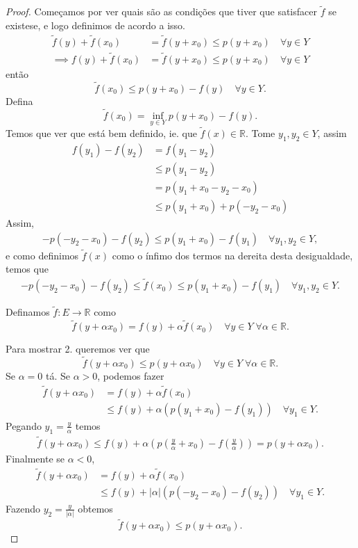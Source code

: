 \documentclass[portuguese]{article}
\theoremstyle{definition}
\newcommand{\R}{\mathbb{R}}
\begin{document}
	\begin{proof}
		Começamos por ver quais são as condições que tiver que satisfacer $\tilde{f}$ se existese, e logo definimos de acordo a isso.
		\begin{align*}
			\tilde{f}(y)+\tilde{f}(x_0)&=\tilde{f}(y+ x_0)\leq p(y+x_0)\quad\forall y\in Y\\
			\implies f(y)+\tilde{f}(x_0)&=\tilde{f}(y+ x_0)\leq p(y+x_0)\quad\forall y\in Y
		\end{align*}
		então
		\[\tilde{f}(x_0)\leq p(y+x_0)-f(y)\quad\forall y\in Y.\]
		Defina
		\[\tilde{f}(x_0)=\inf_{y\in Y}p(y+x_0)-f(y).\]
		Temos que ver que está bem definido, ie. que $\tilde{f}(x)\in\R$. Tome $y_1,y_2\in Y$, assim
		\begin{align*}
			f(y_1)-f(y_2)&=f(y_1-y_2)\\
			&\leq p(y_1-y_2)\\
			&=p(y_1+x_0-y_2-x_0)\\
			&\leq p(y_1+x_0)+p(-y_2-x_0)
		\end{align*}
		Assim,
		\begin{gather*}
			-p(-y_2-x_0)-f(y_2)\leq p(y_1+x_0)-f(y_1)\quad\forall y_1,y_2\in Y,
		\end{gather*}
		e como definimos $\tilde{f}(x)$ como o ínfimo dos termos na dereita desta desigualdade, temos que
		\begin{align*}
			-p(-y_2-x_0)-f(y_2)\leq\tilde{f}(x_0)\leq p(y_1+x_0)-f(y_1)\quad\forall y_1,y_2\in Y.
		\end{align*}
		
		Definamos $\tilde{f}:E\to\R$ como \[\tilde{f}(y+\alpha x_0)=f(y)+\alpha\tilde{f}(x_0)\quad\forall y\in Y\; \forall\alpha\in\R.\]
		
		Para mostrar 2. queremos ver que
		\[\tilde{f}(y+\alpha x_0)\leq p(y+\alpha x_0)\quad\forall y\in Y\;\forall\alpha\in\R.\]
		Se $\alpha=0$ tá. Se $\alpha>0$, podemos fazer
		\begin{align*}
			\tilde{f}(y+\alpha x_0)&=f(y)+\alpha\tilde{f}(x_0)\\
			&\leq f(y)+\alpha\left(p(y_1+x_0)-f(y_1)\right)\quad\forall y_1\in Y.
		\end{align*}
		Pegando $y_1=\frac{y}{\alpha}$ temos
		\begin{align*}
			\tilde{f}(y+\alpha x_0)\leq f(y)+\alpha\left(p\left(\frac{y}{\alpha}+x_0\right)-f\left(\frac{y}{\alpha}\right)\right)=p(y+\alpha x_0).
		\end{align*}
		Finalmente se $\alpha<0$,
		\begin{align*}
			\tilde{f}(y+\alpha x_0)&=f(y)+\alpha\tilde{f}(x_0)\\
			&\leq f(y)+|\alpha|\left(p(-y_2-x_0)-f(y_2)\right)\quad\forall y_1\in Y.
		\end{align*}
		Fazendo {\color{orange}$y_2=\frac{y}{|\alpha|}$} obtemos
		\[\tilde{f}(y+\alpha x_0)\leq p(y+\alpha x_0).\]
	\end{proof}
\end{document}

